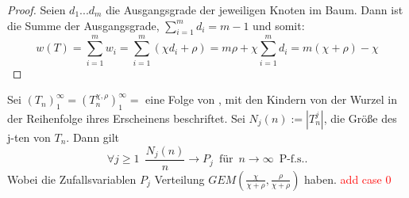 \begin{proof}
    Seien $d_1...d_m$ die Ausgangsgrade der jeweiligen Knoten im Baum. Dann ist die Summe der Ausgangsgrade, $\sum_{i=1}^{m}d_i = m-1$ und somit:
    \[
     w(T) = \sum_{i=1}^{m}w_i = \sum_{i=1}^{m} (\chi d_i + \rho) = m \rho + \chi \sum_{i = 1}^{m} d_i = m(\chi + \rho) - \chi  
    \]
\end{proof}
\begin{theorem} \cite[Theorem 3.2]{janson2019random}
    \label{linpreft Grenzwert}
    Sei $(T_n)_1^\infty =(T_n^{\chi,\rho})_1^\infty = $ eine Folge von \linpreft, mit den Kindern von der Wurzel in der Reihenfolge ihres Erscheinens beschriftet. Sei $N_j(n) := |T^j_n|$, die Größe des j-ten \PsubT von $T_n$. Dann gilt 
    \[ 
        \forall j \geq 1  \hspace{6pt} \frac{N_j(n)}{n}  \rightarrow P_j \hspace{6pt} \text{für} \hspace{6pt} n \rightarrow \infty \hspace{6pt} \text{P-f.s.}.
  \]
Wobei die Zufallsvariablen  $P_j$ Verteilung $GEM(\frac{\chi}{\chi+\rho},{\frac{\rho}{\chi+\rho}})$ haben. \textcolor{red}{add case 0} 
\end{theorem}
